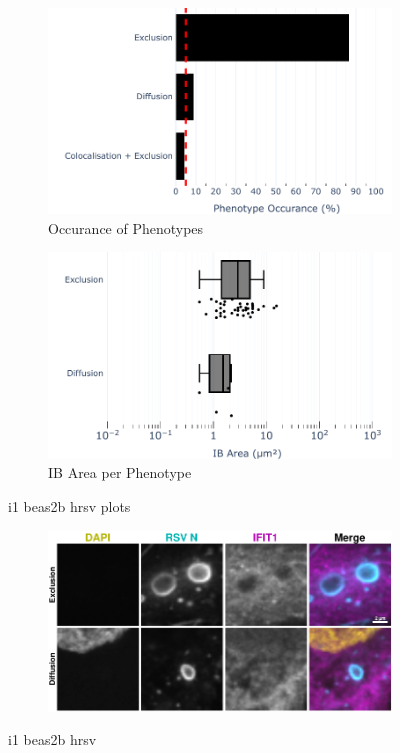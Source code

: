 \begin{figure}
    \begin{subfigure}{0.5\textwidth}
        \includegraphics[width=1\linewidth]{09. Chapter 4/Figs/02. Infection/01. IFIT1/04. bar_i1_beas2b.pdf} 
        \caption[]{Occurance of Phenotypes}
    \end{subfigure}
    \begin{subfigure}{0.5\textwidth}
        \includegraphics[width=1\linewidth]{09. Chapter 4/Figs/02. Infection/01. IFIT1/05. box_i1_beas2b.pdf}
        \caption[]{IB Area per Phenotype}
    \end{subfigure}
    \caption[i1 beas2b hrsv plots]{i1 beas2b hrsv plots}
    \label{fig:i1 beas2b hrsv plots}

    \begin{subfigure}{1\textwidth}
        \centering
        \includegraphics[width=1\linewidth]{09. Chapter 4/Figs/02. Infection/01. IFIT1/06. beas2b i1.pdf}
    \end{subfigure}
    \caption[i1 beas2b hrsv]{i1 beas2b hrsv}
    \label{fig:i1 beas2b hrsv}
\end{figure}
